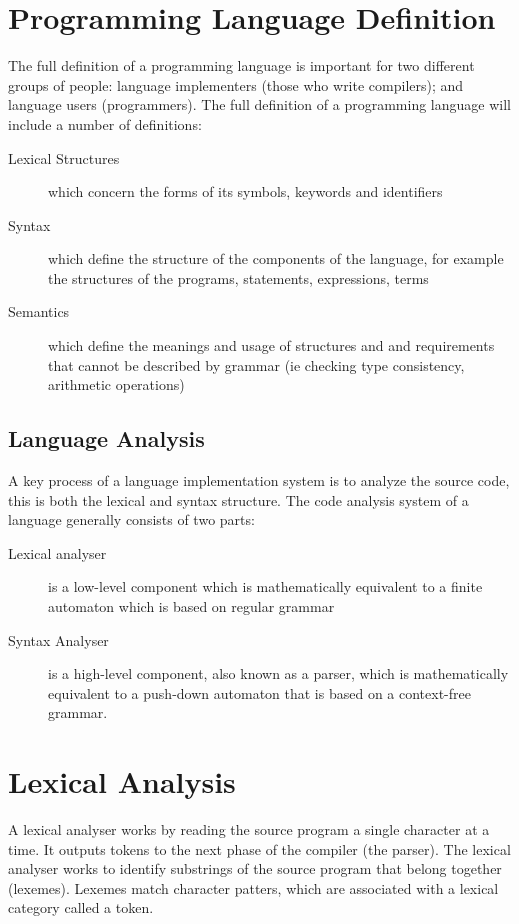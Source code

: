 
\section{Programming Language Definition}
The full definition of a programming language is important for two different groups of people: language implementers (those who write compilers); and language users (programmers). The full definition of a programming language will include a number of definitions:
\begin{description}
    \item[Lexical Structures] which concern the forms of its symbols, keywords and identifiers
    \item[Syntax] which define the structure of the components of the language, for example the structures of the programs, statements, expressions, terms
    \item[Semantics] which define the meanings and usage of structures and and requirements that cannot be described by grammar (ie checking type consistency, arithmetic operations) 
\end{description}

\subsection{Language Analysis}
A key process of a language implementation system is to analyze the source code, this is both the lexical and syntax structure. The code analysis system of a language generally consists of two parts: 
\begin{description}
    \item[Lexical analyser] is a low-level component which is mathematically equivalent to a finite automaton which is based on regular grammar
    \item[Syntax Analyser] is a high-level component, also known as a parser, which is mathematically equivalent to a push-down automaton that is based on a context-free grammar.
\end{description}

\section{Lexical Analysis}
A lexical analyser works by reading the source program a single character at a time. It outputs tokens to the next phase of the compiler (the parser). The lexical analyser works to identify substrings of the source program that belong together (lexemes). Lexemes match character patters, which are associated with a lexical category called a token. 

